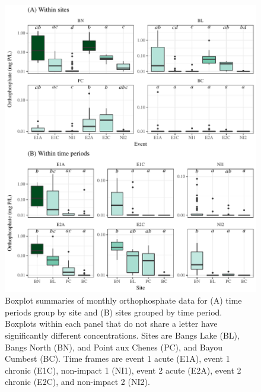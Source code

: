 \documentclass[letterpaper,12pt]{article}\usepackage[]{graphicx}\usepackage[]{color}
\makeatletter
\def\maxwidth{ %
  \ifdim\Gin@nat@width>\linewidth
    \linewidth
  \else
    \Gin@nat@width
  \fi
}
\makeatother
\begin{document}
\begin{figure}[!ht]

{\centering \includegraphics[width=\maxwidth]{figs/Fig6} 

}

\caption[Boxplot summaries of monthly orthophosphate data for (A) time periods group by site and (B) sites grouped by time period]{Boxplot summaries of monthly orthophosphate data for (A) time periods group by site and (B) sites grouped by time period. Boxplots within each panel that do not share a letter have significantly different concentrations. Sites are Bangs Lake (BL), Bangs North (BN), and Point aux Chenes (PC), and Bayou Cumbest (BC).  Time frames are event 1 acute (E1A), event 1 chronic (E1C), non-impact 1 (NI1), event 2 acute (E2A), event 2 chronic (E2C), and non-impact 2 (NI2).}\label{fig:Fig6}
\end{figure}
\end{document}
